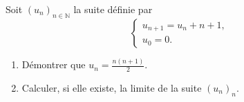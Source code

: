 
\begin{exercice}\label{exoDS_2010_6bis}

Soit $(u_n)_{n\in\mathbb{N}}$ la suite définie par 
\begin{equation}
 \left\{ \begin{array}{ll}
    u_{n+1}=u_n+n+1,\\
    u_0=0.
  \end{array}\right.
\end{equation}
\begin{enumerate}
\item Démontrer que $\displaystyle u_n=\frac{n(n+1)}{2}$.
\item Calculer, si elle existe, la limite de la suite $(u_n)_{n}$.
\end{enumerate}

\end{exercice}
